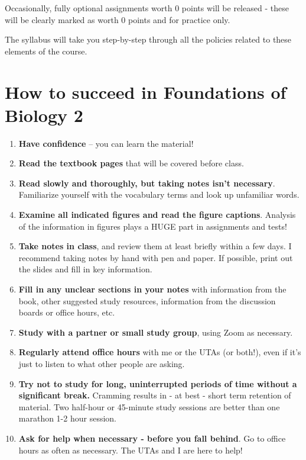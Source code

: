 \documentclass[
]{book}
\providecommand{\tightlist}{%
  \setlength{\itemsep}{0pt}\setlength{\parskip}{0pt}}
\begin{document}
Occasionally, fully optional assignments worth 0 points will be released - these will be clearly marked as worth 0 points and for practice only.

The syllabus will take you step-by-step through all the policies related to these elements of the course.

\hypertarget{how-to-succeed-in-foundations-of-biology-2}{%
\chapter{How to succeed in Foundations of Biology 2}\label{how-to-succeed-in-foundations-of-biology-2}}

\begin{enumerate}
\def\labelenumi{\arabic{enumi}.}
\tightlist
\item
  \textbf{Have confidence} -- you can learn the material!\\
\item
  \textbf{Read the textbook pages} that will be covered before class.
\item
  \textbf{Read slowly and thoroughly, but taking notes isn't necessary}. Familiarize yourself with the vocabulary terms and look up unfamiliar words.
\item
  \textbf{Examine all indicated figures and read the figure captions}. Analysis of the information in figures plays a HUGE part in assignments and tests!
\item
  \textbf{Take notes in class}, and review them at least briefly within a few days. I recommend taking notes by hand with pen and paper. If possible, print out the slides and fill in key information.
\item
  \textbf{Fill in any unclear sections in your notes} with information from the book, other suggested study resources, information from the discussion boards or office hours, etc.
\item
  \textbf{Study with a partner or small study group}, using Zoom as necessary.
\item
  \textbf{Regularly attend office hours} with me or the UTAs (or both!), even if it's just to listen to what other people are asking.
\item
  \textbf{Try not to study for long, uninterrupted periods of time without a significant break.} Cramming results in - at best - short term retention of material. Two half-hour or 45-minute study sessions are better than one marathon 1-2 hour session.
\item
  \textbf{Ask for help when necessary - before you fall behind}. Go to office hours as often as necessary. The UTAs and I are here to help!
\end{enumerate}
\end{document}
